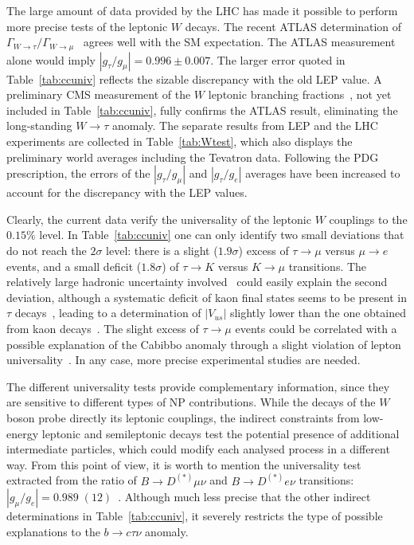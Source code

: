 \documentclass[10pt]{article}
\begin{document}
The large amount of data provided by the LHC has made it possible to perform more precise tests of the leptonic $W$ decays. The recent ATLAS determination of $\Gamma_{W\to\tau}/\Gamma_{W\to \mu}$~\cite{Aad:2020ayz} agrees well with the SM expectation. The ATLAS measurement alone would imply $|g_\tau/g_\mu| =0.996\pm 0.007$. The larger error quoted in Table~\ref{tab:ccuniv} reflects the sizable discrepancy with the old LEP value. A preliminary CMS measurement of the $W$ leptonic branching fractions~\cite{CMS:2021qxj}, not yet included in Table~\ref{tab:ccuniv}, fully confirms the ATLAS result, eliminating the long-standing $W\to\tau$ anomaly. The separate results from LEP and the LHC experiments are collected in Table~\ref{tab:Wtest}, which also displays the preliminary world averages including the Tevatron data. Following the PDG prescription, the errors of the $|g_\tau/g_\mu|$ and $|g_\tau/g_e|$ averages have been increased to account for the discrepancy with the LEP values.

Clearly, the current data verify the universality of the leptonic $W$ couplings to the $0.15\%$ level. In Table~\ref{tab:ccuniv} one can only identify two small deviations that do not reach the $2\sigma$ level: there is a slight ($1.9\sigma$) excess of $\tau\to\mu$ versus $\mu\to e$ events, and a small deficit ($1.8\sigma$) of $\tau\to K$ versus $K\to\mu$ transitions. The relatively large hadronic uncertainty involved~\cite{Arroyo-Urena:2021nil} could easily explain the second deviation, although a systematic deficit of kaon final states seems to be present in $\tau$ decays~\cite{Pich:2013lsa}, leading to a determination of $|V_{us}|$ slightly lower than the one obtained from kaon decays~\cite{Gamiz:2004ar,Gamiz:2006xx,Pich:2020gzz}.
The slight excess of $\tau\to\mu$ events could be correlated with a possible explanation of the Cabibbo anomaly through a slight violation of lepton universality~\cite{Crivellin:2020lzu,Crivellin:2020oup,Crivellin:2020klg}.
In any case, more precise experimental studies are needed.

The different universality tests provide complementary information, since they are sensitive to different types of NP contributions. While the decays of the $W$ boson probe directly its leptonic couplings, the indirect constraints from low-energy leptonic and semileptonic decays test the potential presence of additional intermediate particles, which could modify each analysed process in a different way. From this point of view, it is worth to mention the universality test extracted from the ratio of $B\to D^{(*)}\mu\nu$ and 
$B\to D^{(*)}e\nu$ transitions: $|g_\mu/g_e| = 0.989\; (12)$~\cite{Jung:2018lfu}. Although much less precise that the other indirect determinations in Table~\ref{tab:ccuniv}, it severely restricts the type of possible explanations to the $b\to c\tau\nu$ anomaly.
\end{document}
